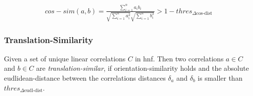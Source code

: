 \begin{align}
    cos-sim(a,b) = \frac{\sum_{i=1}^{n} a_{i} b_{i}}{\sqrt{\sum_{i=1}^{n} a_{i}^{2}} \sqrt{\sum_{i=1}^{n} b_{i}^{2}}} > 1 - thres_{\Delta \text{cos-dist}}
\end{align}

\subsubsection*{Translation-Similarity}
Given a set of unique linear correlations $C$ in \gls{hnf}. Then two correlations $a \in C$ and $b \in C$ are \textit{translation-similar}, if orientation-similarity holds and the absolute eudlidean-distance between the correlations distances $\delta_a$ and $\delta_b$ is smaller than $thres_{\Delta \text{eudl-dist}}$.